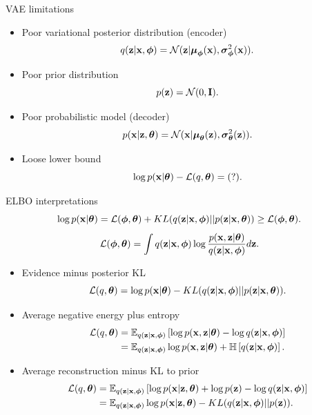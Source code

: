 \begin{frame}{VAE limitations}
	\begin{itemize}
		\item Poor variational posterior distribution (encoder)
		\[
			q(\bz | \bx, \bphi) = \mathcal{N}(\bz| \bmu_{\bphi}(\bx), \bsigma^2_{\bphi}(\bx)).
		\]
		\item Poor prior distribution
		\[
			p(\bz) = \mathcal{N}(0, \mathbf{I}).
		\]
		\item Poor probabilistic model (decoder)
		\[
			p(\bx | \bz, \btheta) = \mathcal{N}(\bx| \bmu_{\btheta}(\bz), \bsigma^2_{\btheta}(\bz)).
		\]
		\item Loose lower bound
		\[
			\log p(\bx | \btheta) - \mathcal{L}(q, \btheta) = (?).
		\]
	\end{itemize}
\end{frame}
\begin{frame}{ELBO interpretations}
	\[
		\log p(\bx | \btheta) = \cL (\bphi, \btheta) + KL(q(\bz | \bx, \bphi) || p(\bz | \bx, \btheta)) \geq  \cL (\bphi, \btheta).
	\]
	\[
		\cL (\bphi, \btheta) = \int q(\bz | \bx, \bphi) \log \frac{p(\bx, \bz | \btheta)}{q(\bz | \bx, \bphi)} d \bz.
	\]
	\begin{itemize}
	    \item Evidence minus posterior KL
	    \vspace{-0.1cm}
	    \[
	        \mathcal{L}(q, \btheta) = \log p(\bx | \btheta) - KL(q(\bz | \bx, \bphi) || p(\bz | \bx, \btheta)).
	    \]
	    \item Average negative energy plus entropy
	    \vspace{-0.1cm}
	    \begin{align*}
	        \mathcal{L}(q, \btheta) &= \mathbb{E}_{q(\bz | \bx, \bphi)} \left[\log p(\bx, \bz | \btheta) - \log q(\bz | \bx, \bphi)  \right] \\
	        &= \mathbb{E}_{q(\bz | \bx, \bphi)} \log p(\bx, \bz | \btheta) + \mathbb{H} \left[q(\bz | \bx, \bphi) \right].
	    \end{align*}
	    \item Average reconstruction minus KL to prior
	    \vspace{-0.1cm}
	    \begin{align*}
	        \mathcal{L}(q, \btheta) &= \mathbb{E}_{q(\bz | \bx, \bphi)} \left[ \log p(\bx | \bz, \btheta) + \log p(\bz) - \log q(\bz | \bx, \bphi) \right] \\
	        &= \mathbb{E}_{q(\bz | \bx, \bphi)} \log p(\bx | \bz, \btheta) - KL(q(\bz | \bx, \bphi) || p(\bz)).
	    \end{align*}
	\end{itemize}
\end{frame}
